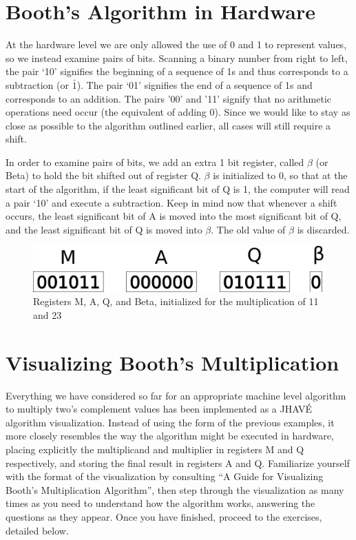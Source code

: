 \documentclass{article}
\begin{document}

\section{Booth's Algorithm in Hardware}
    At the hardware level we are only allowed the use of 0 and 1 to represent values, so we instead examine pairs of bits.
Scanning a binary number from right to left, the pair `10' signifies the beginning of a sequence of 1s and thus corresponds to a subtraction (or $\bar{1}$).
The pair `01' signifies the end of a sequence of 1s and corresponds to an addition.
The pairs '00' and '11' signify that no arithmetic operations need occur (the equivalent of adding 0).
Since we would like to stay as close as possible to the algorithm outlined earlier, all cases will still require a shift.

    In order to examine pairs of bits, we add an extra 1 bit register, called $\beta$ (or Beta) to hold the bit shifted out of register Q.
$\beta$ is initialized to 0, so that at the start of the algorithm, if the least significant bit of Q is 1, the computer will read a pair `10' and execute a subtraction.
Keep in mind now that whenever a shift occurs, the least significant bit of A is moved into the most significant bit of Q, and the least significant bit of Q is moved into $\beta$.
The old value of $\beta$ is discarded.

\begin{figure}[h]
\centering
\includegraphics[scale=0.4]{init2.pdf}
\caption{Registers M, A, Q, and Beta, initialized for the multiplication of 11 and 23}
\end{figure}%

\pagebreak

\section{Visualizing Booth's Multiplication}
Everything we have considered so far for an appropriate machine level algorithm to multiply two's complement values has been implemented as a JHAVÉ algorithm visualization.
Instead of using the form of the previous examples, it more closely resembles the way the algorithm might be executed in hardware, placing explicitly the multiplicand and multiplier in registers M and Q respectively, and storing the final result in registers A and Q.
Familiarize yourself with the format of the visualization by consulting ``A Guide for Visualizing Booth’s Multiplication Algorithm'', then step through the visualization as many times as you need to understand how the algorithm works, answering the questions as they appear.
Once you have finished, proceed to the exercises, detailed below.
\end{document}
